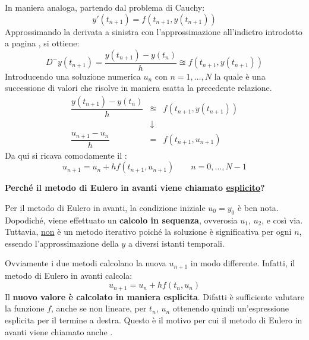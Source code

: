 \highspace
In maniera analoga, partendo dal problema di Cauchy:
\begin{equation*}
	y'\left(t_{n+1}\right) = f\left(t_{n+1}, y\left(t_{n+1}\right)\right)
\end{equation*}
Approssimando la derivata a sinistra con l'approssimazione all'indietro introdotto a pagina \pageref{eq: approssimazione all'indietro della derivata prima}, si ottiene:
\begin{equation*}
	D^{-} y\left(t_{n+1}\right) = \dfrac{y\left(t_{n+1}\right) - y\left(t_{n}\right)}{h} \approxeq f\left(t_{n+1}, y\left(t_{n+1}\right)\right)
\end{equation*}
Introducendo una soluzione numerica $u_{n}$ con $n = 1, \dots, N$ la quale è una successione di valori che risolve in maniera esatta la precedente relazione.
\begin{equation*}
	\begin{array}{rcl}
		\dfrac{y\left(t_{n+1}\right) - y\left(t_{n}\right)}{h} &\approxeq& f\left(t_{n+1}, y\left(t_{n+1}\right)\right) \\ [1em]
		&\downarrow& \\ [.5em]
		\dfrac{
			u_{n+1} - u_{n}
		}{h} &=& f\left(t_{n+1}, u_{n+1}\right)
	\end{array}
\end{equation*}
Da qui si ricava comodamente il :
\begin{equation}\label{eq: metodo di Eulero all'indietro}
	u_{n+1} = u_{n} + hf\left(t_{n+1}, u_{n+1}\right) \hspace{2em} n = 0, \dots, N - 1
\end{equation}

\newpage
\begin{flushleft}
	\textcolor{Green3}{ \textbf{Perché il metodo di Eulero in avanti viene chiamato \underline{esplicito}?}}
\end{flushleft}
Per il metodo di Eulero in avanti, la condizione iniziale $u_{0} = y_{0}$ è ben nota. Dopodiché, viene effettuato un \textbf{calcolo in sequenza}, ovverosia $u_{1}$, $u_{2}$, e così via. Tuttavia, \underline{non} è un metodo iterativo poiché la soluzione è significativa per ogni $n$, essendo l'approssimazione della $y$ a diversi istanti temporali.

\highspace
Ovviamente i due metodi calcolano la nuova $u_{n+1}$ in modo differente. Infatti, il metodo di Eulero in avanti calcola:
\begin{equation*}
	u_{n+1} = u_{n} + hf\left(t_{n}, u_{n}\right)
\end{equation*}
Il \textbf{nuovo valore è calcolato in maniera esplicita}. Difatti è sufficiente valutare la funzione $f$, anche se non lineare, per $t_{n}$, $u_{n}$ ottenendo quindi un'espressione esplicita per il termine a destra. Questo è il motivo per cui il metodo di Eulero in avanti viene chiamato anche .

